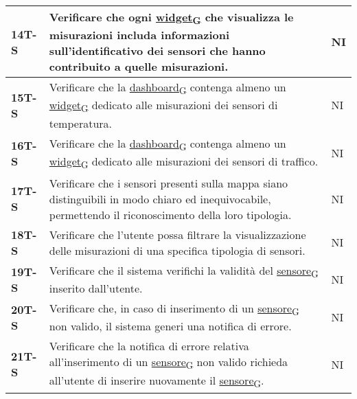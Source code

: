 \begin{longtable}{|>{\raggedright\arraybackslash}m{}|>{\raggedright\arraybackslash}m{}|>{\raggedright\arraybackslash}m{}|}
	\hline
	\textbf{14T-S}  & Verificare che ogni \href{https://7last.github.io/docs/rtb/documentazione-interna/glossario\#widget}{widget\textsubscript{G}} che visualizza le misurazioni includa informazioni sull’identificativo dei sensori che hanno contribuito a quelle misurazioni.                          & NI             \\
	\hline
	\textbf{15T-S}  & Verificare che la \href{https://7last.github.io/docs/rtb/documentazione-interna/glossario\#dashboard}{dashboard\textsubscript{G}} contenga almeno un \href{https://7last.github.io/docs/rtb/documentazione-interna/glossario\#widget}{widget\textsubscript{G}} dedicato alle misurazioni dei sensori di temperatura.                                                                        & NI             \\
	\hline
	\textbf{16T-S}  & Verificare che la \href{https://7last.github.io/docs/rtb/documentazione-interna/glossario\#dashboard}{dashboard\textsubscript{G}} contenga almeno un \href{https://7last.github.io/docs/rtb/documentazione-interna/glossario\#widget}{widget\textsubscript{G}} dedicato alle misurazioni dei sensori di traffico.                                                                           & NI             \\
	\hline
	\textbf{17T-S}  & Verificare che i sensori presenti sulla mappa siano distinguibili in modo chiaro ed inequivocabile, permettendo il riconoscimento della loro tipologia.                            & NI             \\
	\hline
	\textbf{18T-S}  & Verificare che l’utente possa filtrare la visualizzazione delle misurazioni di una specifica tipologia di sensori.                                                                 & NI             \\
	\hline
	\textbf{19T-S}  & Verificare che il sistema verifichi la validità del \href{https://7last.github.io/docs/rtb/documentazione-interna/glossario\#sensore}{sensore\textsubscript{G}} inserito dall’utente.                                                                                                  & NI             \\
	\hline
	\textbf{20T-S}  & Verificare che, in caso di inserimento di un \href{https://7last.github.io/docs/rtb/documentazione-interna/glossario\#sensore}{sensore\textsubscript{G}} non valido, il sistema generi una notifica di errore.                                                                         & NI             \\
	\hline
	\textbf{21T-S}  & Verificare che la notifica di errore relativa all’inserimento di un \href{https://7last.github.io/docs/rtb/documentazione-interna/glossario\#sensore}{sensore\textsubscript{G}} non valido richieda all’utente di inserire nuovamente il \href{https://7last.github.io/docs/rtb/documentazione-interna/glossario\#sensore}{sensore\textsubscript{G}}.                                      & NI             \\

\end{longtable}

